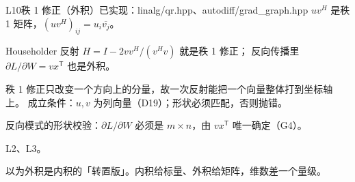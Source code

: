 \begin{know}{L10}{秩 1 修正（外积）}{已实现：linalg/qr.hpp、autodiff/grad\_graph.hpp}
 $uv^{H}$ 是秩 1 矩阵，$(uv^{H})_{ij}=u_i\overline{v_j}$。

 Householder 反射 $H=I-2vv^{H}/(v^{H}v)$ 就是秩 1 修正；
反向传播里 $\partial L/\partial W=vx^{\mathsf T}$ 也是外积。

 秩 1 修正只改变一个方向上的分量，故一次反射能把一个向量整体打到坐标轴上。
成立条件：$u,v$ 为列向量（D19）；形状必须匹配，否则抛错。

 反向模式的形状校验：$\partial L/\partial W$ 必须是 $m\times n$，由 $vx^{\mathsf T}$ 唯一确定（G4）。

 L2、L3。

 以为外积是内积的「转置版」。内积给标量、外积给矩阵，维数差一个量级。
\end{know}
